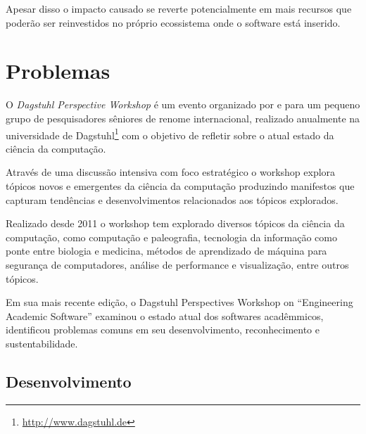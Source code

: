 Apesar disso o impacto causado se reverte potencialmente em mais
recursos que poderão ser reinvestidos no próprio ecossistema onde
o software está inserido.



\section{Problemas}



O {\it Dagstuhl Perspective Workshop} é um evento organizado por e para um
pequeno grupo de pesquisadores sêniores de renome internacional, realizado
anualmente na universidade de Dagstuhl\footnote{\url{http://www.dagstuhl.de}}
com o objetivo de refletir sobre o atual estado da ciência da computação.

Através de uma discussão intensiva com foco estratégico o workshop explora
tópicos novos e emergentes da ciência da computação produzindo manifestos que
capturam tendências e desenvolvimentos relacionados aos tópicos explorados.

Realizado desde 2011 o workshop tem explorado diversos tópicos da ciência da
computação, como computação e paleografia, tecnologia da informação como ponte
entre biologia e medicina, métodos de aprendizado de máquina para segurança de
computadores, análise de performance e visualização, entre outros tópicos.

Em sua mais recente edição, o Dagstuhl Perspectives Workshop on ``Engineering
Academic Software'' \cite{allen2017engineering} examinou o estado atual dos
softwares acadêmmicos, identificou problemas comuns em seu desenvolvimento,
reconhecimento e sustentabilidade.

\subsection{Desenvolvimento}

